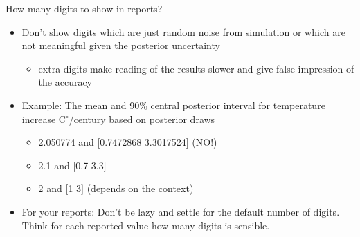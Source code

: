 \documentclass[finnish,english,t]{beamer}
\begin{document}
\begin{frame}
\begin{center}
  \end{center}

\end{frame}

\begin{frame}
  
  {\Large\color{navyblue} How many digits to show in reports?}

  \begin{itemize}
  \item Don't show digits which are just random noise from simulation
    or which are not meaningful given the posterior uncertainty
    \begin{itemize}
    \item extra digits make reading of the results slower and give
      false impression of the accuracy
    \end{itemize}
  \item<2-> Example: The mean and 90\% central posterior interval for temperature
     increase C$^\circ$/century based on posterior draws
     \begin{itemize}
     \item<3-> {\color{red} 2.050774 and $[$0.7472868 3.3017524$]$} (NO!)
     \item<4-> {\color{darkgreen} 2.1 and $[$0.7 3.3$]$}
    \item<5-> {\color{navyblue} 2 and $[$1 3$]$} (depends on the context)
     \end{itemize}
   \item<6-> For your reports: Don't be lazy and settle for the
     default number of digits. Think for each reported value how
     many digits is sensible.
  \end{itemize}

\end{frame}
\end{document}

